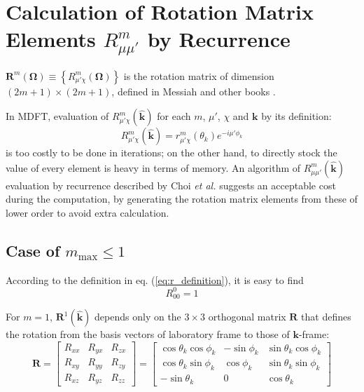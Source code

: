 
\chapter{Calculation of Rotation Matrix Elements $R_{\mu\mu'}^{m}$ by Recurrence\label{chpt:rotM-by-recurrence}}

$\mathbf{R}^{m}(\mathbf{\Omega})\equiv\left\{ R_{\mu'\chi}^{m}(\mathbf{\Omega})\right\} $
is the rotation matrix of dimension $\left(2m+1\right)\times\left(2m+1\right)$,
defined in Messiah and other books \citep{Edmonds,Gray-Gubbins,Messiah}.

In MDFT, evaluation of $R_{\mu'\chi}^{m}(\hat{\mathbf{k}})$ for each
$m$, $\mu'$, $\chi$ and $\mathbf{k}$ by its definition:
\begin{equation}
R_{\mu'\chi}^{m}(\hat{\mathbf{k}})=r_{\mu'\chi}^{m}(\theta_{k})e^{-i\mu'\phi_{k}}\label{eq:r_definition}
\end{equation}
is too costly to be done in iterations; on the other hand, to directly
stock the value of every element is heavy in terms of memory. An algorithm
of $R_{\mu\mu'}^{m}(\hat{\mathbf{k}})$ evaluation by recurrence described
by Choi \textit{et al.} \citep{Choi_1999} suggests an acceptable
cost during the computation, by generating the rotation matrix elements
from these of lower order to avoid extra calculation.

\section{Case of $m_{\mathrm{max}}\leq1$}

According to the definition in eq. (\ref{eq:r_definition}), it is
easy to find
\begin{equation}
R_{00}^{0}=1
\end{equation}

For $m=1$, $\mathbf{R}^{1}(\hat{\mathbf{k}})$ depends only on the
$3\times3$ orthogonal matrix $\mathbf{R}$ that defines the rotation
from the basis vectors of laboratory frame to those of $\mathbf{k}$-frame:
\begin{equation}
\mathbf{R}=\left[\begin{array}{ccc}
R_{xx} & R_{yx} & R_{zx}\\
R_{xy} & R_{yy} & R_{zy}\\
R_{xz} & R_{yz} & R_{zz}
\end{array}\right]=\left[\begin{array}{ccc}
\cos\theta_{k}\cos\phi_{k} & -\sin\phi_{k} & \sin\theta_{k}\cos\phi_{k}\\
\cos\theta_{k}\sin\phi_{k} & \cos\phi_{k} & \sin\theta_{k}\sin\phi_{k}\\
-\sin\theta_{k} & 0 & \cos\theta_{k}
\end{array}\right]
\end{equation}

